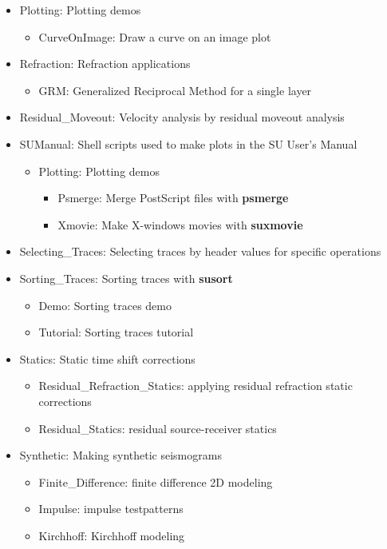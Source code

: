\begin{itemize}
\begin{itemize}
	\end{itemize}
\item Plotting:  Plotting demos
	\begin{itemize}
	\item CurveOnImage: Draw a curve on an image plot
	\end{itemize}
\item Refraction:   Refraction applications
	\begin{itemize}
	\item GRM:  Generalized Reciprocal Method for a single layer
	\end{itemize}
\item Residual\_Moveout: Velocity analysis by residual moveout analysis
\item SUManual:   Shell scripts used to make plots in the SU User's Manual
	\begin{itemize}
	\item Plotting: Plotting demos
		\begin{itemize}
		\item Psmerge: Merge PostScript files with {\bf psmerge\/}
		\item Xmovie: Make X-windows movies with {\bf suxmovie\/}
		\end{itemize}
	\end{itemize}
\item Selecting\_Traces:   Selecting traces by header values for specific operations
\item Sorting\_Traces:  Sorting traces with {\bf susort\/}
	\begin{itemize}
	\item Demo:  Sorting traces demo
	\item Tutorial:  Sorting traces tutorial
	\end{itemize}
\item Statics:  Static time shift corrections
	\begin{itemize}
	\item Residual\_Refraction\_Statics:  applying residual refraction static corrections
	\item Residual\_Statics: residual source-receiver statics
	\end{itemize}
\item Synthetic: Making synthetic seismograms
	\begin{itemize}
	\item Finite\_Difference: finite difference 2D modeling
	\item Impulse:  impulse testpatterns
	\item Kirchhoff:  Kirchhoff modeling

\end{itemize}
\end{itemize}
